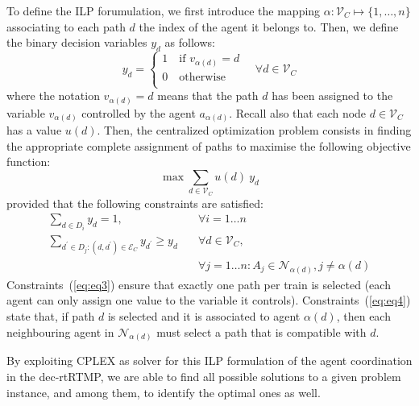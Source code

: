 To define the ILP forumulation, we first introduce the mapping $\alpha : \mathcal{V}_C \mapsto \{1, \ldots, n\}$ associating to each path $d$ the index of the agent it belongs to. Then, we define the binary decision variables $y_d$ as follows:
%
\begin{equation}
\label{eq:binary}
y_d = \left\{
                \begin{array}{ll}
                  1 \quad \mbox{if $v_{\alpha(d)}=d$}     \\
                  0	\quad \mbox{otherwise}\\
                \end{array}
                 \right. \quad \forall d \in \mathcal{V}_C
\end{equation}
where the notation $v_{\alpha(d)}=d$ means that the path $d$ has been assigned to the variable $v_{\alpha(d)}$ controlled by the agent $a_{\alpha(d)}$. 
Recall also that each node $d \in \mathcal{V}_C$ has a value $u(d)$. 
Then, the centralized optimization problem consists in finding the appropriate complete assignment of paths to maximise the following objective function: 
%
\begin{equation}\label{eq:objective}
\max\sum_{d \in \mathcal{V}_C} u(d) \ y_d 
\end{equation}
provided that the following constraints are satisfied:
\begin{align}
\sum_{d \in D_i} y_d = 1,\quad      &\forall i = 1 \ldots n  \label{eq:eq3} \\[10pt] 
\sum_{d^{\prime} \in D_j : (d, d^{\prime}) \in \mathcal{E}_C} y_{d^{\prime}}  \geq y_d \quad &\forall d \in \mathcal{V}_C, \nonumber \\[-15pt] 
                                                                                       &\forall j=1 \ldots n : A_j  \in \mathcal{N}_{\alpha(d)}, j \neq \alpha(d) \label{eq:eq4}
\end{align}
Constraints~(\ref{eq:eq3}) ensure that exactly one path per train is selected (each agent can only assign one value to the variable it controls). Constraints~(\ref{eq:eq4}) state that, if path $d$ is selected and it is associated to agent $\alpha(d)$, then each neighbouring agent in $\mathcal{N}_{\alpha(d)}$ must select a path that is compatible with $d$.

By exploiting CPLEX as solver for this ILP formulation of the agent coordination in the dec-rtRTMP, we are able to find all possible solutions to a given problem instance, and among them, to identify the optimal ones as well.
